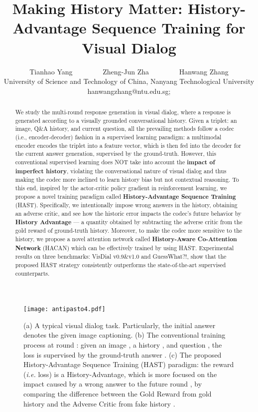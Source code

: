 \documentclass[10pt,twocolumn,letterpaper]{article}
\begin{document}
\title{Making History Matter: History-Advantage Sequence Training for Visual Dialog}

\author{Tianhao Yang ~~~~~~~~Zheng-Jun Zha   ~~~~~~~~Hanwang Zhang\\
University of Science and Technology of China,
	Nanyang Technological University \\
	hanwangzhang@ntu.edu.sg;
}
\maketitle



\begin{abstract}
   We study the multi-round response generation in visual dialog, where a response is generated according to a visually grounded conversational history. Given a triplet: an image, Q\&A history, and current question, all the prevailing methods follow a codec (i.e., encoder-decoder) fashion in a supervised learning paradigm: a multimodal encoder encodes the triplet into a feature vector, which is then fed into the decoder for the current answer generation, supervised by the ground-truth. However, this conventional supervised learning does NOT take into account the \textbf{impact of imperfect history}, violating the conversational nature of visual dialog and thus making the codec more inclined to learn history bias but not contextual reasoning. To this end, inspired by the actor-critic policy gradient in reinforcement learning, we propose a novel training paradigm called \textbf{History-Advantage Sequence Training} (HAST). Specifically, we intentionally impose wrong answers in the history, obtaining an adverse critic, and see how the historic error impacts the codec's future behavior by \textbf{History Advantage} --- a quantity obtained by subtracting the adverse critic from the gold reward of ground-truth history. Moreover, to make the codec more sensitive to the history, we propose a novel attention network called \textbf{History-Aware Co-Attention Network} (HACAN) which can be effectively trained by using HAST. Experimental results on three benchmarks: VisDial v0.9\&v1.0 and GuessWhat?!, show that the proposed HAST strategy consistently outperforms the state-of-the-art supervised counterparts.
\end{abstract}
\begin{figure}[t]
\begin{center}
\texttt{[image: antipasto4.pdf]}
\end{center}
    \caption{(a) A typical visual dialog task. Particularly, the initial answer  denotes the given image captioning. (b) The conventional training process at round : given an image , a history , and question , the loss is supervised by the ground-truth answer {\color{green}}. (c) The proposed History-Advantage Sequence Training (HAST) paradigm: the reward (\emph{i.e.}  loss) is a History-Advantage, which is more focused on the impact caused by a wrong answer {\color{red}} to the future round , by comparing the difference between the Gold Reward from gold history  and the Adverse Critic from fake history .
    }
  \label{fig:1}
\end{figure}
\end{document}
